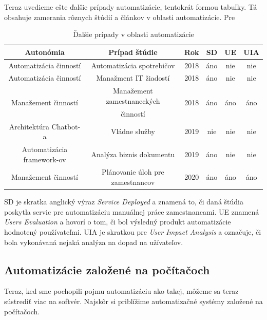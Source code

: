 \documentclass[twoside,slovak, a4paper]{article}
\begin{document}
Teraz uvedieme ešte ďalšie prípady automatizácie, tentokrát formou tabuľky. Tá obsahuje zamerania rôznych štúdií a článkov v oblasti automatizácie. Pre 


\begin{table}[h]
    \centering
    \caption{Ďalšie prípady v oblasti automatizácie\cite{BAVARESCO2023100618}}
    \begin{tabular}{|c|c|c|c|c|c|} %
        \hline
        Autonómia & Prípad štúdie & Rok & SD & UE & UIA \\
        \hline\hline
        Automatizácia činností & Automatizácia spotrebičov & 2018 & áno & nie & nie \\
        \hline
        Automatizácia činností & Manažment IT žiadostí & 2018 & áno & nie & nie \\
        \hline
        \multirow{2}{*}{Manažement činností} & Manažement zamestnaneckých & \multirow{2}{*}{2018} & \multirow{2}{*}{áno} & \multirow{2}{*}{áno} & \multirow{2}{*}{áno}  \\ & činností & &&&\\
        \hline
        Architektúra Chatbot-a & Vládne služby & 2019 & nie & nie & nie \\
        \hline
        Automatizácia framework-ov & Analýza biznis dokumentu & 2019 & áno & nie & nie \\
        \hline
       Manažement činností & Plánovanie úloh pre zamestnancov & 2020 & áno & áno & áno \\
        \hline
    \end{tabular}
\end{table}

SD je skratka anglický výraz \textit{Service Deployed} a znamená to, či daná štúdia poskytla servic pre automatizáciu manuálnej práce zamestnancami. UE znamená \textit{Users Evaluation} a hovorí o tom, či bol výsledný produkt automatizácie hodnotený používateľmi. UIA je skratkou pre \textit{User Impact Analysis} a označuje, či bola vykonávaná nejaká analýza na dopad na užívateľov.


\subsection{Automatizácie založené na počítačoch}

Teraz, ked sme pochopili pojmu automatizáciu ako takej, môžeme sa teraz sústrediť viac na softvér. Najskôr si priblížime automatizačné systémy založené na počítačoch.
\end{document}
